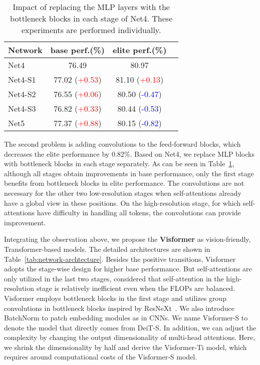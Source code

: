 \documentclass[10pt,twocolumn,letterpaper]{article}
\begin{document}
\begin{table}
\begin{center}
\begin{tabular}{|l|c|c|c|}
\hline
Network & base perf.(\%)& elite perf.(\%)\\
\hline\hline
Net4 & 76.49  & 80.97 \\
\hline
Net4-S1  & 77.02 (\textcolor{red}{+0.53}) & 81.10 (\textcolor{red}{+0.13}) \\
Net4-S2  & 76.55 (\textcolor{red}{+0.06}) & 80.50 (\textcolor{blue}{-0.47})\\
Net4-S3  & 76.82 (\textcolor{red}{+0.33}) & 80.44 (\textcolor{blue}{-0.53})\\
\hline
Net5 & 77.37 (\textcolor{red}{+0.88}) & 80.15 (\textcolor{blue}{-0.82})\\
\hline
\end{tabular}
\end{center}
\caption{Impact of replacing the MLP layers with the bottleneck blocks in each stage of Net4. These experiments are performed individually.}
\label{tab:convolution-ablation}
\end{table}



The second problem is adding  convolutions to the feed-forward blocks, which decreases the elite performance by 0.82\%. Based on Net4, we replace MLP blocks with bottleneck blocks in each stage separately. As can be seen in Table~\ref{tab:convolution-ablation}, although all stages obtain improvements in base performance, only the first stage benefits from bottleneck blocks in elite performance. The  convolutions are not necessary for the other two low-resolution stages when self-attentions already have a global view in these positions. On the high-resolution stage, for which self-attentions have difficulty in handling all tokens, the  convolutions can provide improvement.

Integrating the observation above, we propose the \textbf{Visformer} as vision-friendly, Transformer-based models. The detailed architectures are shown in Table~\ref{tab:network-archtecture}. Besides the positive transitions, Visformer adopts the stage-wise design for higher base performance. But self-attentions are only utilized in the last two stages, considered that self-attention in the high-resolution stage is relatively inefficient even when the FLOPs are balanced. Visformer employs bottleneck blocks in the first stage and utilizes group  convolutions in bottleneck blocks inspired by ResNeXt~\cite{xie2016aggregated}. We also introduce BatchNorm to patch embedding modules as in CNNs. We name Visformer-S to denote the model that directly comes from DeiT-S. In addition, we can adjust the complexity by changing the output dimensionality of multi-head attentions. Here, we shrink the dimensionality by half and derive the Visformer-Ti model, which requires around  computational costs of the Visformer-S model.
\end{document}
